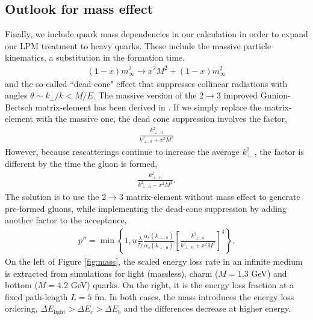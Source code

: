 \documentclass[aps, prc, reprint, amsmath, groupedaddress, nofootinbib]{revtex4-1}
\begin{document}
\subsection{Outlook for mass effect}
Finally, we include quark mass dependencies in our calculation in order to expand our LPM treatment to heavy quarks. These include the massive particle kinematics, a substitution in the formation time,
\begin{eqnarray}
(1-x)m_\infty^2 \rightarrow x^2M^2 + (1-x)m_\infty^2
\end{eqnarray}
and the so-called ``dead-cone" effect that suppresses collinear radiations with angles $\theta \sim k_\perp/k < M/E$. 
The massive version of the $2\rightarrow3$ improved Gunion-Bertsch matrix-element has been derived in \cite{Uphoff:2014hza}.
If we simply replace the matrix-element with the massive one, the dead cone suppression involves the factor,
\begin{eqnarray}
\frac{k_{\perp,0}^2}{k_{\perp,0}^2+x^2M^2}
\end{eqnarray}
However, because rescatterings continue to increase the average $k_{\perp}^2$ , the factor is different by the time the gluon is formed,
\begin{eqnarray}
\frac{k_{\perp,n}^2}{k_{\perp,n}^2+x^2M^2}.
\end{eqnarray}
The solution is to use the $2\rightarrow3$ matrix-element without mass effect to generate pre-formed gluons, while implementing the dead-cone suppression by adding another factor to the acceptance,
\begin{eqnarray}
p'' = \min\left\{1, u\frac{\tilde{\lambda}}{\tau_f}\frac{\alpha_s(k_{\perp,n})}{\alpha_s(k_{\perp,0})} \left[\frac{k_{\perp,n}^2}{k_{\perp,n}^2+x^2 M^2}\right]^4\right\}.
\end{eqnarray}
On the left of Figure \ref{fig:mass}, the scaled energy loss rate in an infinite medium is extracted from simulations for light (massless), charm ($M=1.3$ GeV) and bottom ($M=4.2$ GeV) quarks. 
On the right, it is the energy loss fraction at a fixed path-length $L=5$ fm.
In both cases, the mass introduces the energy loss ordering, $\Delta E_{\textrm{light}} > \Delta E_c > \Delta E_b$ and the differences decrease at higher energy.

\end{document}
